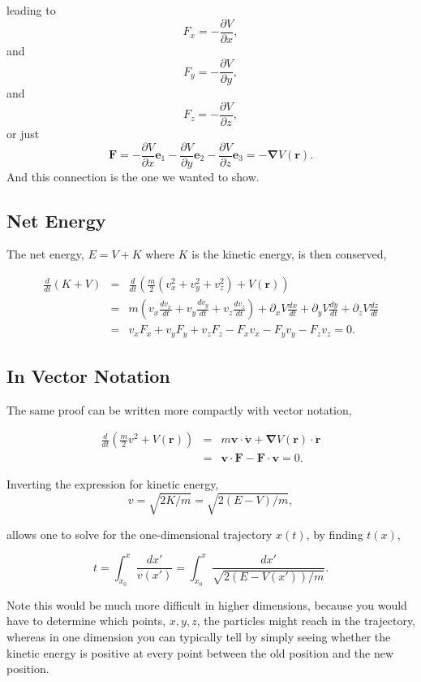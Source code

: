 \documentclass[%
oneside,                 %
final,                   %
10pt]{article}
\begin{document}
leading to
\[
F_x=-\frac{\partial V}{\partial x},
\]
and
\[
F_y=-\frac{\partial V}{\partial y},
\]
and
\[
F_z=-\frac{\partial V}{\partial z},
\]
or just
\[
\bm{F}=-\frac{\partial V}{\partial x}\bm{e}_1-\frac{\partial V}{\partial y}\bm{e}_2-\frac{\partial V}{\partial z}\bm{e}_3=-\bm{\nabla}V(\bm{r}).
\]
And this connection is the one we wanted to show.

\subsection{Net Energy}

The net energy, $E=V+K$ where $K$ is the kinetic energy, is then conserved,

\begin{eqnarray}
\frac{d}{dt}(K+V)&=&\frac{d}{dt}\left(\frac{m}{2}(v_x^2+v_y^2+v_z^2)+V(\bm{r})\right)\\
\nonumber
&=&m\left(v_x\frac{dv_x}{dt}+v_y\frac{dv_y}{dt}+v_z\frac{dv_z}{dt}\right)
+\partial_xV\frac{dx}{dt}+\partial_yV\frac{dy}{dt}+\partial_zV\frac{dz}{dt}\\
\nonumber
&=&v_xF_x+v_yF_y+v_zF_z-F_xv_x-F_yv_y-F_zv_z=0.
\end{eqnarray}

\subsection{In Vector Notation}

The same proof can be written more compactly with vector notation,

\begin{eqnarray}
\frac{d}{dt}\left(\frac{m}{2}v^2+V(\bm{r})\right)
&=&m\bm{v}\cdot\dot{\bm{v}}+\bm{\nabla} V(\bm{r})\cdot\dot{\bm{r}}\\
\nonumber
&=&\bm{v}\cdot\bm{F}-\bm{F}\cdot\bm{v}=0.
\end{eqnarray}

Inverting the expression for kinetic energy,
\begin{equation}
v=\sqrt{2K/m}=\sqrt{2(E-V)/m},
\end{equation}

allows one to solve for the one-dimensional trajectory $x(t)$, by finding $t(x)$,

\begin{equation}
t=\int_{x_0}^x \frac{dx'}{v(x')}=\int_{x_0}^x\frac{dx'}{\sqrt{2(E-V(x'))/m}}.
\end{equation}

Note this would be much more difficult in higher dimensions, because
you would have to determine which points, $x,y,z$, the particles might
reach in the trajectory, whereas in one dimension you can typically
tell by simply seeing whether the kinetic energy is positive at every
point between the old position and the new position.
\end{document}
